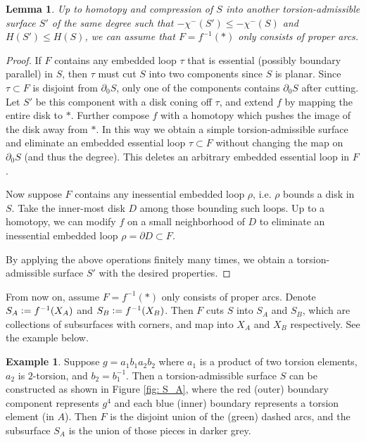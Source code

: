 \documentclass{amsart}
\newtheorem{lemma}[theorem]{Lemma}
\theoremstyle{definition}
\newtheorem{example}[theorem]{Example}
\numberwithin{equation}{section}
\theoremstyle{theorem}
\theoremstyle{remark}
\def\defeq{\vcentcolon=}
\begin{document}
	\begin{lemma}
		Up to homotopy and compression of $S$ into another	torsion-admissible surface $S'$ of the same degree such that $-\chi^-(S')\le -\chi^-(S)$ and $H(S')\le H(S)$, we can assume that $F=f^{-1}(*)$ only consists of proper arcs.
	\end{lemma}
	\begin{proof}
		If $F$ contains any embedded loop $\tau$ that is essential (possibly boundary parallel) in $S$, then $\tau$ must cut $S$ into two components since $S$ is planar. Since $\tau\subset F$ is disjoint from $\partial_0 S$, only one of the components contains $\partial_0 S$ after cutting.
		Let $S'$ be this component with a disk coning off $\tau$, and extend $f$ by mapping the entire disk to $*$. 
		Further compose $f$ with a homotopy which pushes the image of the disk away from $*$. 
		In this way we obtain a simple torsion-admissible surface and eliminate an embedded essential loop $\tau\subset F$ without changing the map on $\partial_0 S$ (and thus the degree). This deletes an arbitrary embedded essential loop in $F$.
		
		Now suppose $F$ contains any inessential embedded loop $\rho$, i.e. $\rho$ bounds a disk in $S$. Take the inner-most disk $D$ among those bounding such loops. Up to a homotopy, we can modify $f$ on a small neighborhood of $D$ to eliminate an inessential embedded loop $\rho=\partial D\subset F$. 
		
		By applying the above operations finitely many times, we obtain a torsion-admissible surface $S'$ with the desired properties.
	\end{proof}
	
	From now on, assume $F=f^{-1}(*)$ only consists of proper arcs. Denote $S_A\defeq f^{-1}(X_A)$ and $S_B\defeq f^{-1}(X_B)$.
	Then $F$ cuts $S$ into $S_A$ and $S_B$, which are collections of subsurfaces with corners, and map into $X_A$ and $X_B$ respectively. See the example below.
	
	\begin{example}
		Suppose $g=a_1b_1a_2b_2$ where $a_1$ is a product of two torsion elements, $a_2$ is $2$-torsion, and $b_2=b_1^{-1}$. Then a torsion-admissible surface $S$ can be constructed as shown in Figure \ref{fig: S_A},
		where the red (outer) boundary component represents $g^4$ and each blue (inner) boundary represents a torsion element (in $A$).
		Then $F$ is the disjoint union of the (green) dashed arcs, and the subsurface $S_A$ is the union of those pieces in darker grey. 
	\end{example}
	
\end{document}
